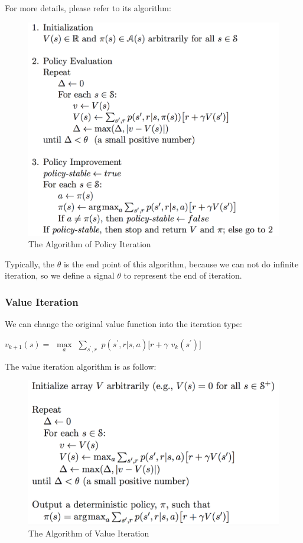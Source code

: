 \documentclass[10pt,twocolumn,letterpaper]{article}
\begin{document}
	For more details, please refer to its algorithm:
	
	\begin{figure}[!htb]
    	\centering
    	\includegraphics[width = \linewidth]{images/policy_iteration}
    	\caption{The Algorithm of Policy Iteration}
    	\label{fig::policy_iteration}
   \end{figure}
   
   Typically, the $\theta$ is the end point of this algorithm, because we can not do infinite iteration, so we define a signal $\theta$ to represent the end of iteration.
	
	\subsubsection{Value Iteration}
	We can change the original value function into the iteration type:
	
	\begin{center}
		$v_{k+1}(s)=$
		$\max\limits_{a}$
		$\sum\limits_{s^{'},r}^{}$
		$p(s^{'},r|s,a)[r+\gamma$
		$v_{k}(s^{'})]$
	\end{center}
	
	The value iteration algorithm is as follow:
	
	\begin{figure}[!htb]
    	\centering
    	\includegraphics[width = \linewidth]{images/value_iteration}
    	\caption{The Algorithm of Value Iteration}
    	\label{fig::value_iteration}
   \end{figure}
   
\end{document}
